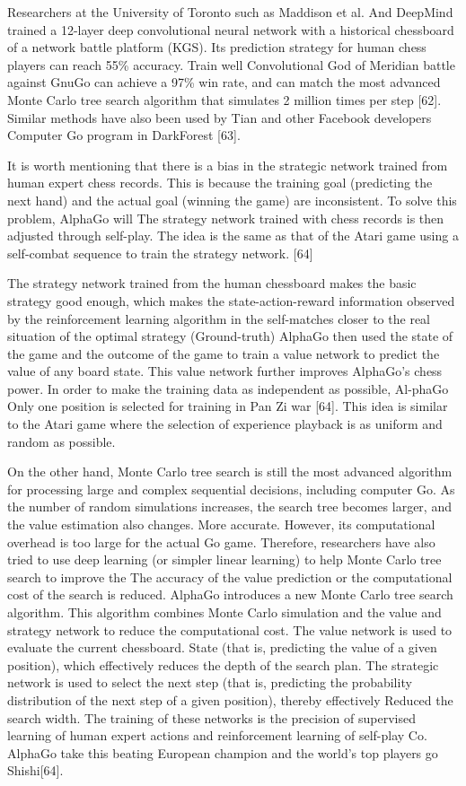 \documentclass[11pt,en]{elegantpaper}
\begin{document}
Researchers at the University of Toronto such as Maddison et al. And DeepMind trained a 12-layer deep convolutional neural network with a historical chessboard of a network battle platform (KGS). Its prediction strategy for human chess players can reach 55\% accuracy. Train well Convolutional God of Meridian battle against GnuGo can achieve a 97\% win rate, and can match the most advanced Monte Carlo tree search algorithm that simulates 2 million times per step [62]. Similar methods have also been used by Tian and other Facebook developers Computer Go program in DarkForest [63].

It is worth mentioning that there is a bias in the strategic network trained from human expert chess records. This is because the training goal (predicting the next hand) and the actual goal (winning the game) are inconsistent. To solve this problem, AlphaGo will The strategy network trained with chess records is then adjusted through self-play. The idea is the same as that of the Atari game using a self-combat sequence to train the strategy network. [64]

The strategy network trained from the human chessboard makes the basic strategy good enough, which makes the state-action-reward information observed by the reinforcement learning algorithm in the self-matches closer to the real situation of the optimal strategy (Ground-truth) AlphaGo then used the state of the game and the outcome of the game to train a value network to predict the value of any board state. This value network further improves AlphaGo's chess power. In order to make the training data as independent as possible, Al-phaGo Only one position is selected for training in Pan Zi war [64]. This idea is similar to the Atari game where the selection of experience playback is as uniform and random as possible.

On the other hand, Monte Carlo tree search is still the most advanced algorithm for processing large and complex sequential decisions, including computer Go. As the number of random simulations increases, the search tree becomes larger, and the value estimation also changes. More accurate. However, its computational overhead is too large for the actual Go game. Therefore, researchers have also tried to use deep learning (or simpler linear learning) to help Monte Carlo tree search to improve the The accuracy of the value prediction or the computational cost of the search is reduced. AlphaGo introduces a new Monte Carlo tree search algorithm. This algorithm combines Monte Carlo simulation and the value and strategy network to reduce the computational cost. The value network is used to evaluate the current chessboard. State (that is, predicting the value of a given position), which effectively reduces the depth of the search plan. The strategic network is used to select the next step (that is, predicting the probability distribution of the next step of a given position), thereby effectively Reduced the search width. The training of these networks is the precision of supervised learning of human expert actions and reinforcement learning of self-play Co. AlphaGo take this beating European champion and the world's top players go Shishi[64].
\end{document}
